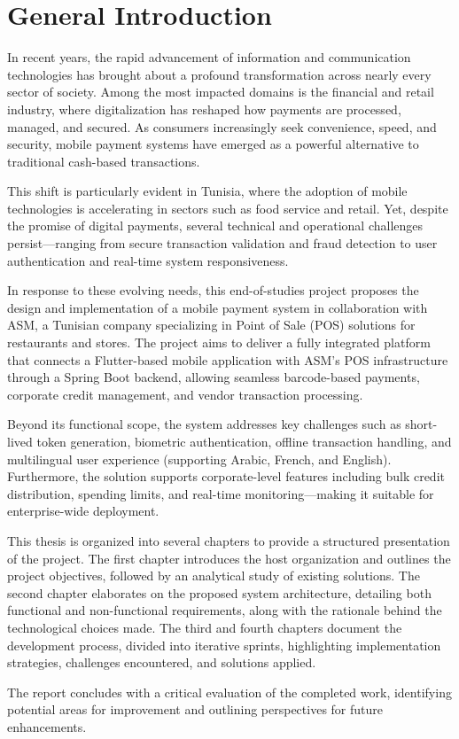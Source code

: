 \chapter*{General Introduction}
\adjustmtc

In recent years, the rapid advancement of information and communication technologies has brought about a profound transformation across nearly every sector of society. Among the most impacted domains is the financial and retail industry, where digitalization has reshaped how payments are processed, managed, and secured. As consumers increasingly seek convenience, speed, and security, mobile payment systems have emerged as a powerful alternative to traditional cash-based transactions.

This shift is particularly evident in Tunisia, where the adoption of mobile technologies is accelerating in sectors such as food service and retail. Yet, despite the promise of digital payments, several technical and operational challenges persist—ranging from secure transaction validation and fraud detection to user authentication and real-time system responsiveness.

In response to these evolving needs, this end-of-studies project proposes the design and implementation of a mobile payment system in collaboration with ASM, a Tunisian company specializing in Point of Sale (POS) solutions for restaurants and stores. The project aims to deliver a fully integrated platform that connects a Flutter-based mobile application with ASM's POS infrastructure through a Spring Boot backend, allowing seamless barcode-based payments, corporate credit management, and vendor transaction processing.

Beyond its functional scope, the system addresses key challenges such as short-lived token generation, biometric authentication, offline transaction handling, and multilingual user experience (supporting Arabic, French, and English). Furthermore, the solution supports corporate-level features including bulk credit distribution, spending limits, and real-time monitoring—making it suitable for enterprise-wide deployment.

This thesis is organized into several chapters to provide a structured presentation of the project. The first chapter introduces the host organization and outlines the project objectives, followed by an analytical study of existing solutions. The second chapter elaborates on the proposed system architecture, detailing both functional and non-functional requirements, along with the rationale behind the technological choices made. The third and fourth chapters document the development process, divided into iterative sprints, highlighting implementation strategies, challenges encountered, and solutions applied.

The report concludes with a critical evaluation of the completed work, identifying potential areas for improvement and outlining perspectives for future enhancements.